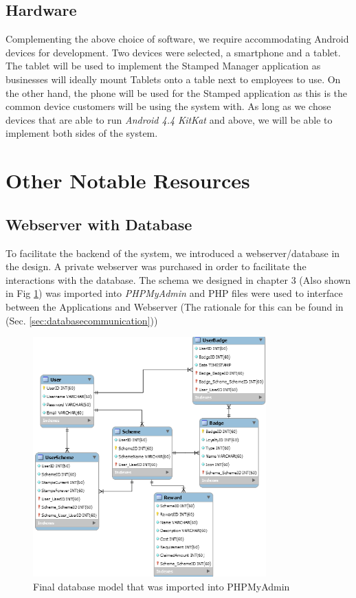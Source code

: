 \subsection{Hardware}
Complementing the above choice of software, we require accommodating Android devices for development. Two devices were selected, a smartphone and a tablet. The tablet will be used to implement the Stamped Manager application as businesses will ideally mount Tablets onto a table next to employees to use. On the other hand, the phone will be used for the Stamped application as this is the common device customers will be using the system with. As long as we chose devices that are able to run \emph{Android 4.4 KitKat} and above, we will be able to implement both sides of the system. 

\section{Other Notable Resources}
\subsection{Webserver with Database}
To facilitate the backend of the system, we introduced a webserver/database in the design. A private webserver was purchased in order to facilitate the interactions with the database. The schema we designed in chapter 3 (Also shown in Fig \ref{fig:finaldb2}) was imported into \emph{PHPMyAdmin} and PHP files were used to interface between the Applications and Webserver (The rationale for this can be found in (Sec. \ref{sec:databasecommunication}))

\begin{figure}[H]
  \centering
    \includegraphics[width=0.8\textwidth]{img/architecture.png}
      \caption{Final database model that was imported into PHPMyAdmin}
      \label{fig:finaldb2}
\end{figure}

